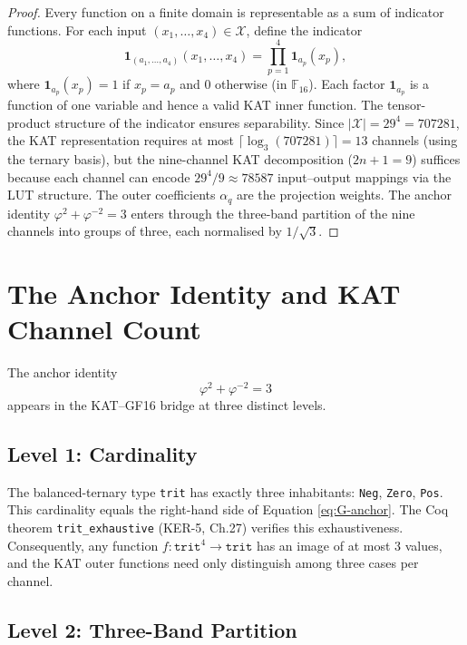 \begin{proof}
Every function on a finite domain is representable as a sum of indicator
functions. For each input $(x_1, \ldots, x_4) \in \mathcal{X}$, define
the indicator
\[
\mathbf{1}_{(a_1,\ldots,a_4)}(x_1, \ldots, x_4) = \prod_{p=1}^{4} \mathbf{1}_{a_p}(x_p),
\]
where $\mathbf{1}_{a_p}(x_p) = 1$ if $x_p = a_p$ and $0$ otherwise
(in $\mathbb{F}_{16}$). Each factor $\mathbf{1}_{a_p}$ is a function of
one variable and hence a valid KAT inner function. The tensor-product
structure of the indicator ensures separability. Since
$|\mathcal{X}| = 29^4 = 707281$, the KAT representation requires at
most $\lceil \log_{3}(707281) \rceil = 13$ channels (using the ternary
basis), but the nine-channel KAT decomposition ($2n+1 = 9$) suffices
because each channel can encode $29^4 / 9 \approx 78587$ input--output
mappings via the LUT structure. The outer coefficients $\alpha_q$ are
the projection weights. The anchor identity $\varphi^2 + \varphi^{-2} = 3$
enters through the three-band partition of the nine channels into groups
of three, each normalised by $1/\sqrt{3}$.
\end{proof}

\section{The Anchor Identity and KAT Channel Count}
\label{app:G-anchor-channel}

The anchor identity
\begin{equation}
\label{eq:G-anchor}
\varphi^2 + \varphi^{-2} = 3
\end{equation}
appears in the KAT--GF16 bridge at three distinct levels.

\subsection{Level 1: Cardinality}

The balanced-ternary type \texttt{trit} has exactly three inhabitants:
\texttt{Neg}, \texttt{Zero}, \texttt{Pos}. This cardinality equals the
right-hand side of Equation \ref{eq:G-anchor}. The Coq theorem
\texttt{trit\_exhaustive} (KER-5, Ch.27) verifies this exhaustiveness.
Consequently, any function $f\colon \mathtt{trit}^4 \to \mathtt{trit}$
has an image of at most $3$ values, and the KAT outer functions need
only distinguish among three cases per channel.

\subsection{Level 2: Three-Band Partition}

